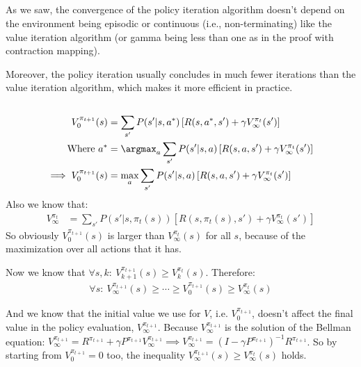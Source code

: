 \documentclass{article}
\begin{document}
\subsection{}
As we saw, the convergence of the policy iteration algorithm doesn't depend on the environment being episodic or continuous (i.e., non-terminating) like the value iteration algorithm (or gamma being less than one as in the proof with contraction mapping).

Moreover, the policy iteration usually concludes in much fewer iterations than the value iteration algorithm, which makes it more efficient in practice.

\subsection{}
\begin{align*}
V_{0}^{\pi_{t+1}}(s) &= \sum_{s'} P(s'|s, a^*)\left[ R(s,a^*,s') + \gamma V_{\infty}^{\pi_{t}}(s') \right]\\
\text{Where } a^* &= \argmax_{a} \sum_{s'} P(s'|s,a) \left[ R(s,a,s') + \gamma V_{\infty}^{\pi_{t}}(s') \right]\\
\implies V_{0}^{\pi_{t+1}}(s) &= \max_a \sum_{s'} P(s'|s,a) \left[ R(s,a,s') + \gamma V_{\infty}^{\pi_{t}}(s') \right]\\
\end{align*}
Also we know that:
\begin{align*}
V_{\infty}^{\pi_t} &= \sum_{s'} P(s'|s,\pi_t(s)) \left[ R(s,\pi_t(s),s') + \gamma V_{\infty}^{\pi_{t}}(s') \right]
\end{align*}
So obviously \(V_0^{\pi_{t+1}}(s)\) is larger than \(V_{\infty}^{\pi_t}(s)\) for all \(s\), because of the maximization over all actions that it has.

Now we know that \(\forall s, k:\ V_{k+1}^{\pi_{t+1}}(s) \ge V_{k}^{\pi_{t}}(s)\). Therefore:
\begin{align*}
\forall s:\ V_\infty^{\pi_{t+1}}(s) \ge \cdots \ge V_{0}^{\pi_{t+1}}(s) \ge V_{\infty}^{\pi_t}(s)
\end{align*}

And we know that the initial value we use for \(V\), i.e.  \(V_0^{\pi_{t+1}}\), doesn't affect the final value in the policy evaluation, \(V_\infty^{\pi_{t+1}}\).
Because \(V_\infty^{\pi_{t+1}}\) is the solution of the Bellman equation: \(V^{\pi_{t+1}}_\infty = R^{\pi_{t+1}} + \gamma P^{\pi_{t+1}} V^{\pi_{t+1}}_\infty \implies V^{\pi_{t+1}}_\infty = (I - \gamma P^{\pi_{t+1}})^{-1} R^{\pi_{t+1}}\).
So by starting from \(V_0^{\pi_{t+1}} = 0\) too, the inequality \(V_\infty^{\pi_{t+1}}(s) \ge  V_{\infty}^{\pi_t}(s)\) holds.
\end{document}
